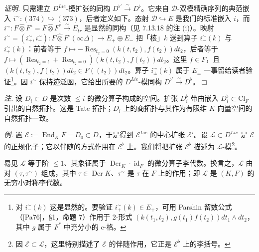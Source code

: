 \emph{证明.} 只需建立 $D^{Lie}$-模扩张的同构 $D^{\flat'}\xrightarrow{\sim}D^{\flat}$。它来自 $\mathcal{D}$-双模精确序列的典范嵌入 $i^{\sim}:(374)\hookrightarrow(373)$，后者定义如下。态射 $\mathcal{D}\hookrightarrow E$ 是我们的标准嵌入 $i$，而 $i^{\sim}:F\widehat{\otimes}F^{\circ}=F\widehat{\otimes}F^{*}\xrightarrow{\sim}E_{tr}$ 是显然的同构（见 7.13.18 的注 (i)）。映射 $i^{\sim}=(i^{\sim}_+,i^{\sim}_-):F\widehat{\otimes}F^{\circ}(\infty\Delta)\to E_+\oplus E_-$ 把「核」$k$ 送到算子 $i^{\sim}_-(k)$ 与 $i^{\sim}_+(k)$：前者等于 $f\mapsto-\operatorname{Res}_{t_{2}=0}(k(t,t_{2}),f(t_{2}))dt_{2}$，后者等于 $f\mapsto(\operatorname{Res}_{t_{2}=t}+\operatorname{Res}_{t_{2}=0})(k(t,t_{2}),f(t_{2}))dt_{2}$。这里 $f\in F$，且 $(k(t,t_{2}),f(t_{2}))dt_{2}\in F((t_{2}))dt_{2}$。算子 $i^{\sim}_{\pm}(k)$ 属于 $E_{\pm}$ 一事留给读者验证\footnote{对 $i^{\sim}_-(k)$ 这是显然的。要验证 $i^{\sim}_+(k)\in E_+$，可用 Parshin 留数公式（[Pa76]，§1，命题 7）作用于 2-形式 $(k(t_{1},t_{2}),g(t_{1})f(t_{2}))dt_{1}\wedge dt_{2}$，其中 $g$ 属于 $F^{*}$ 中充分小的 c-格。}。因 $i^{\sim}$ 保持迹泛函，它给出所要的 $D^{Lie}$-模同构 $D^{\flat'}\xrightarrow{\sim}D^{\flat}$。\hfill$\Box$

\emph{注.} 设 $D_{i}\subset D$ 是次数 $\le i$ 的微分算子构成的空间。扩张 $D^{\flat}_{i}$ 带由嵌入%
$D^{\flat}_{i}\subset\overline{\mathrm{Cl}}_{F}$ 引出的自然拓扑。这是 Tate 拓扑；$D_{i}$ 上的商拓扑与其作为有限维 $K$-向量空间的自然拓扑一致。

 \emph{例.} 置 $\mathcal{E}:=\operatorname{End}_{K}F=D_{0}\subset D$，于是得到 $\mathcal{E}^{Lie}$ 的中心扩张 $\mathcal{E}^{\flat}$。设 $\mathcal{L}\subset D^{Lie}$ 是 $\mathcal{E}$ 的正规化子；它以伴随的方式作用在 $\mathcal{E}^{\flat}$ 上。我们将把扩张 $\mathcal{E}^{\flat}$ 描述为 $\mathcal{L}$-模\footnote{因 $\mathcal{E}\subset\mathcal{L}$，这里特别描述了 $\mathcal{E}$ 的伴随作用，它正是 $\mathcal{E}^{\flat}$ 上的李括号。}。

易见 $\mathcal{L}$ 等于阶 $\le1$、其象征属于 $\operatorname{Der}_{K}\cdot\operatorname{id}_{F}$ 的微分算子李代数。换言之，$\mathcal{L}$ 由对 $(\tau,\tau^{\sim})$ 组成，其中 $\tau\in\operatorname{Der}K$、$\tau^{\sim}$ 是 $\tau$ 在 $F$ 上的作用；即 $\mathcal{L}$ 是 $(K,F)$ 的无穷小对称李代数。

